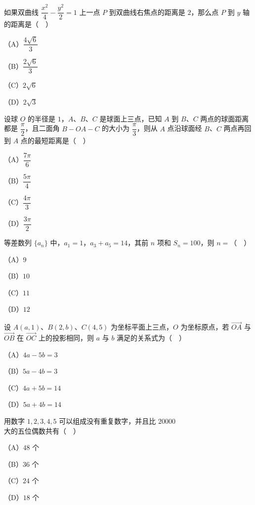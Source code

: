 \begin{question}
如果双曲线 $\dfrac{x^2}{4}-\dfrac{y^2}{2}=1$ 上一点 $P$ 到双曲线右焦点的距离是 $2$，那么点 $P$ 到 $y$ 轴的距离是（　）

（A）$\dfrac{4\sqrt6}{3}$

（B）$\dfrac{2\sqrt6}{3}$

（C）$2\sqrt6$

（D）$2\sqrt3$

\Needspace{0.4\textheight}
\end{question}
\begin{question}
设球 $O$ 的半径是 $1$，$A$、$B$、$C$ 是球面上三点，已知 $A$ 到 $B$、$C$ 两点的球面距离都是 $\dfrac{\pi}{2}$，且二面角 $B-OA-C$ 的大小为 $\dfrac{\pi}{3}$，则从 $A$ 点沿球面经 $B$、$C$ 两点再回到 $A$ 点的最短距离是（　）
\nopagebreak[4]
\begin{center}\end{center}
\nopagebreak[4]
（A）$\dfrac{7\pi}{6}$

（B）$\dfrac{5\pi}{4}$

（C）$\dfrac{4\pi}{3}$

（D）$\dfrac{3\pi}{2}$

\end{question}
\begin{question}
等差数列 $\{a_n\}$ 中，$a_1=1$，$a_3+a_5=14$，其前 $n$ 项和 $S_n=100$，则 $n=$（　）

（A）$9$

（B）$10$

（C）$11$

（D）$12$

\end{question}
\begin{question}
设 $A(a,1)$、$B(2,b)$、$C(4,5)$ 为坐标平面上三点，$O$ 为坐标原点，若 $\overrightarrow{OA}$ 与 $\overrightarrow{OB}$ 在 $\overrightarrow{OC}$ 上的投影相同，则 $a$ 与 $b$ 满足的关系式为（　）

（A）$4a-5b=3$

（B）$5a-4b=3$

（C）$4a+5b=14$

（D）$5a+4b=14$

\end{question}
\begin{question}
用数字 $1,2,3,4,5$ 可以组成没有重复数字，并且比 $20000$ 大的五位偶数共有（　）

（A）$48$ 个

（B）$36$ 个

（C）$24$ 个

（D）$18$ 个

\end{question}
